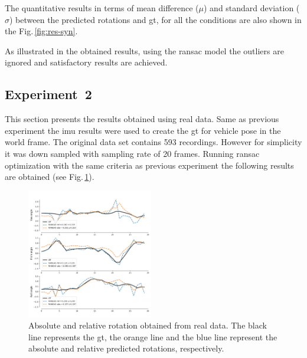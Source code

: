The quantitative results in terms of mean difference ($\mu$) and standard
deviation ($\sigma$) between the predicted rotations and \gls{gt}, for all the
conditions are also shown in the Fig.\,\ref{fig:res-syn}.




As illustrated in the obtained results, using the \gls{ransac}
model the outliers are ignored and satisfactory results are achieved.

\subsection{Experiment~2}
\label{sec:exp2}
This section presents the results obtained using real data. Same as previous
experiment the \gls{imu} results were used to create the \gls{gt} for vehicle
pose in the world frame.
The original data set contains 593 recordings. However for simplicity it was
down sampled with sampling rate of 20 frames.
Running \gls{ransac} optimization with the same criteria as previous experiment the
following results are obtained (see Fig.\,\ref{fig:res-real}).
\begin{figure}
  \centering
  \includegraphics[width=0.49\textwidth]{./content/experiments/figures/real-res.jpeg}
  \caption{Absolute and relative rotation obtained from real data. The black
    line represents the \gls{gt}, the orange line and the blue line represent
    the absolute and relative predicted rotations, respectively.}
  \label{fig:res-real}
\end{figure}

